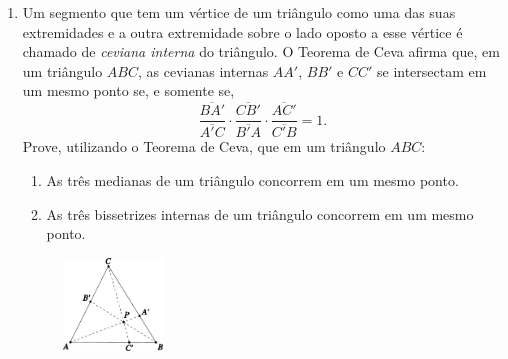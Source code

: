 \documentclass[a4paper,5pt]{amsbook}
\begin{document}
\begin{enumerate}
    \vspace{0.5cm}
    \item Um segmento que tem um v\'ertice de um tri\^angulo como uma das suas
        extremidades e a outra extremidade sobre o lado oposto a esse v\'ertice \'e
        chamado de \textit{ceviana interna} do tri\^angulo. O Teorema de Ceva
        afirma que, em um tri\^angulo $ABC$, as cevianas internas $AA'$, $BB'$ e
        $CC'$ se intersectam em um mesmo ponto se, e somente se,
        \[\frac{\overline{BA'}}{\overline{A'C}} \cdot
        \frac{\overline{CB'}}{\overline{B'A}} \cdot
        \frac{\overline{AC'}}{\overline{C'B}} = 1.\]
        Prove, utilizando o Teorema de Ceva, que em um tri\^angulo $ABC$:
        \begin{enumerate}
            \vspace{0.3cm}
            \item As tr\^es medianas de um tri\^angulo concorrem em um mesmo ponto.
            \vspace{0.3cm}
            \item As tr\^es bissetrizes internas de um tri\^angulo concorrem em um
                mesmo ponto.
        \end{enumerate}
        \begin{figure}[!h]
            \centering
            \includegraphics[width=0.25\textwidth]{fig02-4.pdf}
        \end{figure}
\end{enumerate}
\end{document}
